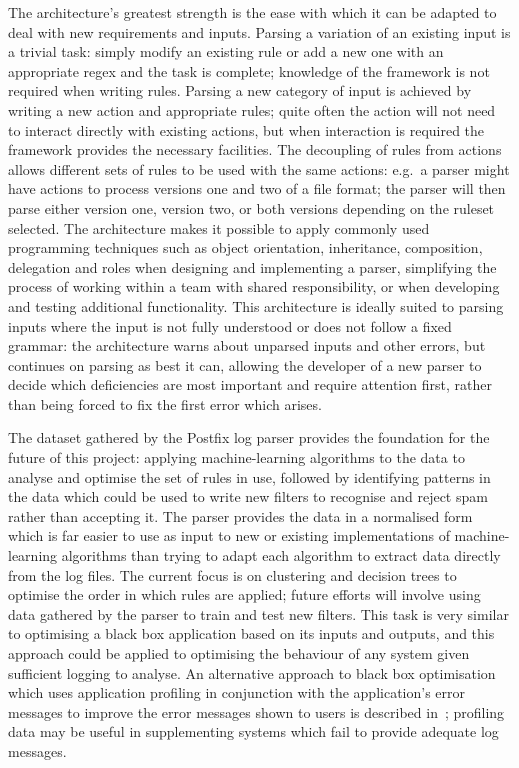 \documentclass[draft]{svmult}
\begin{document}
The architecture's greatest strength is the ease with which it can be
adapted to deal with new requirements and inputs.  Parsing a variation of
an existing input is a trivial task: simply modify an existing rule or add
a new one with an appropriate regex and the task is complete; knowledge of
the framework is not required when writing rules.  Parsing a new category
of input is achieved by writing a new action and appropriate rules; quite
often the action will not need to interact directly with existing actions,
but when interaction is required the framework provides the necessary
facilities.  The decoupling of rules from actions allows different sets of
rules to be used with the same actions: e.g.\ a parser might have actions
to process versions one and two of a file format; the parser will then
parse either version one, version two, or both versions depending on the
ruleset selected.  The architecture makes it possible to apply commonly
used programming techniques such as object orientation, inheritance,
composition, delegation and roles when designing and implementing a parser,
simplifying the process of working within a team with shared
responsibility, or when developing and testing additional functionality.
This architecture is ideally suited to parsing inputs where the input is
not fully understood or does not follow a fixed grammar: the architecture
warns about unparsed inputs and other errors, but continues on parsing as
best it can, allowing the developer of a new parser to decide which
deficiencies are most important and require attention first, rather than
being forced to fix the first error which arises.

The dataset gathered by the Postfix log parser provides the foundation for
the future of this project: applying machine-learning algorithms to the
data to analyse and optimise the set of rules in use, followed by
identifying patterns in the data which could be used to write new filters
to recognise and reject spam rather than accepting it.  The parser provides
the data in a normalised form which is far easier to use as input to new or
existing implementations of machine-learning algorithms than trying to
adapt each algorithm to extract data directly from the log files.  The
current focus is on clustering and decision trees to optimise the order in
which rules are applied; future efforts will involve using data gathered by
the parser to train and test new filters.  This task is very similar to
optimising a black box application based on its inputs and outputs, and
this approach could be applied to optimising the behaviour of any system
given sufficient logging to analyse.  An alternative approach to black box
optimisation which uses application profiling in conjunction with the
application's error messages to improve the error messages shown to users
is described in~\cite{black-box-error-reporting}; profiling data may be
useful in supplementing systems which fail to provide adequate log
messages.
\end{document}
